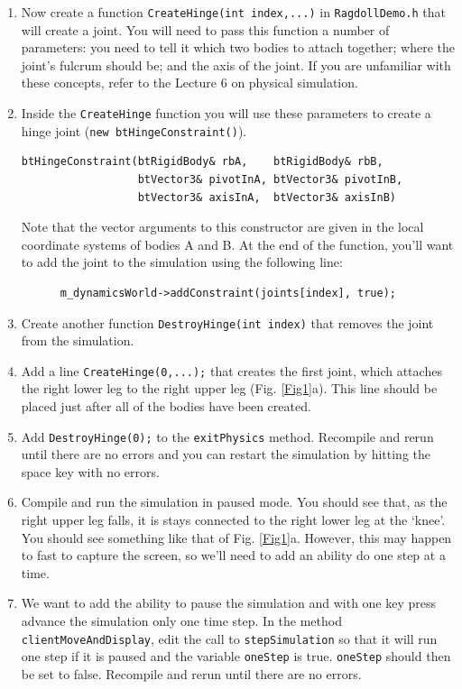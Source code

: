 \documentclass[12pt]{article}
\begin{document}
\begin{enumerate}
\item Now create a function \texttt{CreateHinge(int index,...)} in
  \verb|RagdollDemo.h| that will create a joint. You will need to pass
  this function a number of parameters: you need to tell it which two
  bodies to attach together; where the joint's fulcrum should be; and
  the axis of the joint. If you are unfamiliar with these concepts,
  refer to the Lecture 6 on physical simulation.

\item Inside the \verb|CreateHinge| function you will use these
  parameters to create a hinge joint (\verb|new btHingeConstraint()|).
\begin{verbatim}
btHingeConstraint(btRigidBody& rbA,    btRigidBody& rbB, 
                  btVector3& pivotInA, btVector3& pivotInB, 
                  btVector3& axisInA,  btVector3& axisInB)
\end{verbatim}

Note that the vector arguments to this constructor are given in the
local coordinate systems of bodies A and B.  At the end of the
function, you'll want to add the joint to the simulation using the
following line:
\begin{verbatim}
      m_dynamicsWorld->addConstraint(joints[index], true);
\end{verbatim}

\item Create another function \texttt{DestroyHinge(int index)} that removes the joint from the simulation.

\item Add a line \texttt{CreateHinge(0,...);} that creates the first joint, which attaches the right lower leg to the right upper leg (Fig. \ref{Fig1}a). This line should be placed just after all of the bodies have been created.

\item Add \texttt{DestroyHinge(0);} to the \verb|exitPhysics| method.  Recompile and rerun until there are no errors and you can restart the simulation by hitting the space key with no errors.

\item Compile and run the simulation in paused mode. You should see that, as the right upper leg falls, it is stays connected to the right lower leg at the `knee'. You should see something like that of Fig. \ref{Fig1}a. However, this may happen to fast to capture the screen, so we'll need to add an ability do one step at a time.

\item We want to add the ability to pause the simulation and with one key press advance the simulation only one time step.  In the method \verb|clientMoveAndDisplay|, edit the call to \verb|stepSimulation| so that it will run one step if it is paused and the variable \verb|oneStep| is true.  \verb|oneStep| should then be set to false.  Recompile and rerun until there are no errors.


\end{enumerate}
\end{document}
